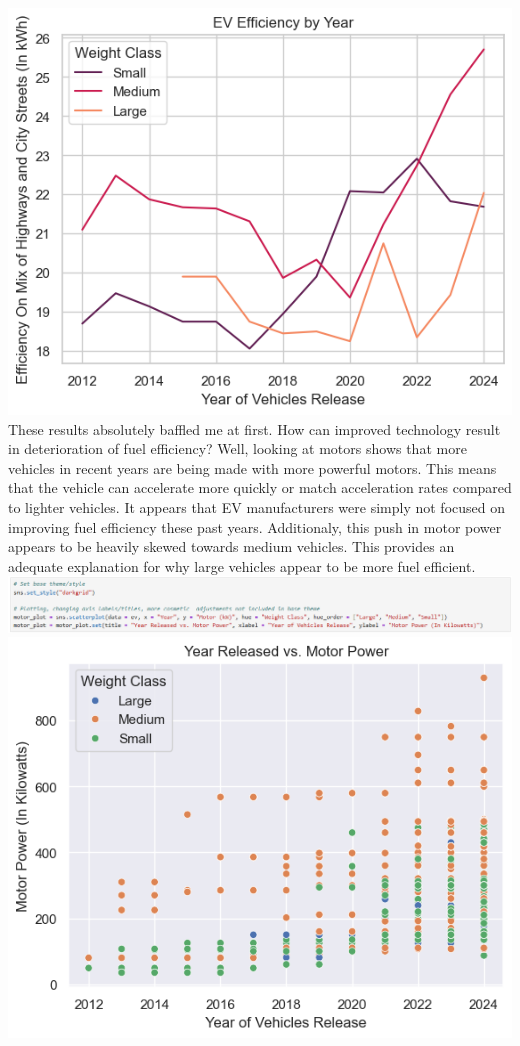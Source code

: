 \documentclass{article}
\begin{document}
{  \includegraphics[width=\textwidth]{graph_04.png}
  \newpage
  These results absolutely baffled me at first. How can improved technology result in deterioration of fuel efficiency?
  Well, looking at motors shows that more vehicles in recent years are being made with more powerful motors. This means that
  the vehicle can accelerate more quickly or match acceleration rates compared to lighter vehicles. It appears that EV
  manufacturers were simply not focused on improving fuel efficiency these past years. Additionaly, this push in motor power
  appears to be heavily skewed towards medium vehicles. This provides an adequate explanation for why large vehicles appear to
  be more fuel efficient.
  \newline \newline
  \includegraphics[width=\textwidth]{code_07.png}
  \includegraphics[width=\textwidth]{graph_05.png}
}
\end{document}
